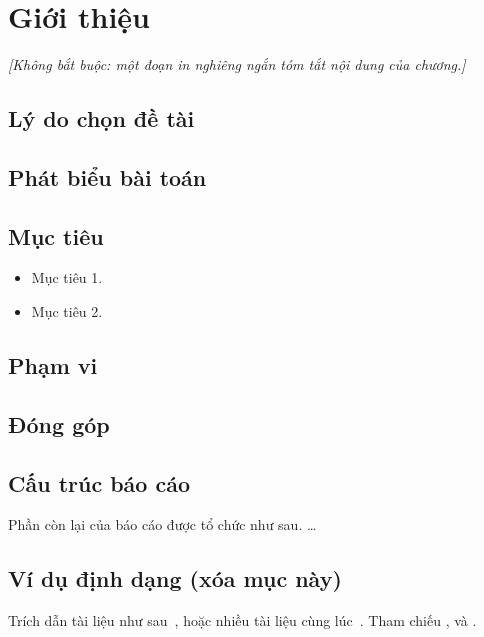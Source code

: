 \chapter{Giới thiệu}
\label{chap:introduction}

\noindent
\textit{[Không bắt buộc: một đoạn in nghiêng ngắn tóm tắt nội dung của chương.]}

\section{Lý do chọn đề tài}

\section{Phát biểu bài toán}

\section{Mục tiêu}
\begin{itemize}
  \item Mục tiêu 1.
  \item Mục tiêu 2.
\end{itemize}

\section{Phạm vi}

\section{Đóng góp}

\section{Cấu trúc báo cáo}
Phần còn lại của báo cáo được tổ chức như sau.  \ldots

\section{Ví dụ định dạng (xóa mục này)}
Trích dẫn tài liệu như sau~\cite{latex2e}, hoặc nhiều tài liệu cùng lúc~\cite{texbook,latex:companion}.
Tham chiếu ,  và .

